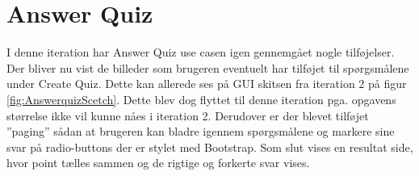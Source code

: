 \section{Answer Quiz}

I denne iteration har Answer Quiz use casen igen gennemgået nogle tilføjelser. Der bliver nu vist de billeder som brugeren eventuelt har tilføjet til spørgsmålene under Create Quiz. Dette kan allerede ses på GUI skitsen fra iteration 2 på figur \ref{fig:AnswerquizScetch}. Dette blev dog flyttet til denne iteration pga. opgavens størrelse ikke vil kunne nåes i iteration 2. Derudover er der blevet tilføjet ''paging'' sådan at brugeren kan bladre igennem spørgsmålene og markere sine svar på radio-buttons der er stylet med Bootstrap.
Som slut vises en resultat side, hvor point tælles sammen og de rigtige og forkerte svar vises.